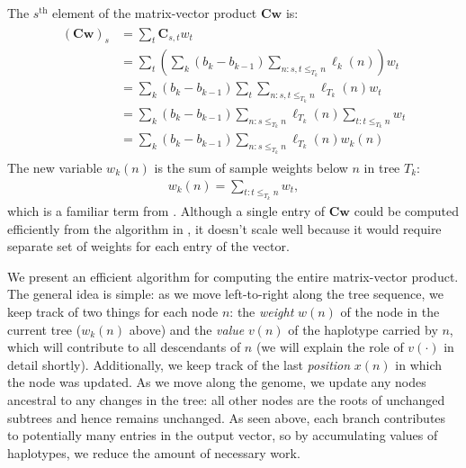 The $s^{\text{th}}$ element of the matrix-vector product $\mathbf{C}\mathbf{w}$ is:
\begin{align} \label{eq:similar_ralph2020}
    \begin{aligned}
        (\mathbf{C}\mathbf{w})_s &=
        \sum_t \mathbf{C}_{s,t} w_t \\
        &=
        \sum_t
        \left(
            \sum_k (b_k - b_{k-1}) \sum_{n: s,t \le_{T_k} n} \ell_k(n)
        \right) {w}_t \\
        &=
        \sum_k (b_k - b_{k-1})
        \sum_t
        \sum_{n: s,t \le_{T_k} n} \ell_{T_k}(n) {w}_t \\
        &=
        \sum_k (b_k - b_{k-1})
        \sum_{n: s\le_{T_k} n} \ell_{T_k}(n)
        \sum_{t:t \le_{T_k} n} {w}_t \\
        &=
        \sum_k (b_k - b_{k-1})
        \sum_{n: s\le_{T_k} n} \ell_{T_k}(n) w_k(n)
    \end{aligned}
\end{align}
The new variable $w_k(n)$ is the sum of sample weights below $n$ in tree $T_k$:
\begin{align}
    w_k(n) = \sum_{t:t \le_{T_k} n} {w}_t ,
\end{align}
which is a familiar term from \citet{ralph2020efficiently}.
Although a single entry of $\mathbf{C}\mathbf{w}$ could be computed efficiently
from the algorithm in \citet{ralph2020efficiently},
it doesn't scale well because it would require separate set of weights for each entry of the vector.

We present an efficient algorithm for computing the entire matrix-vector product.
The general idea is simple: as we move left-to-right along the tree sequence,
we keep track of two things for each node $n$:
the \textit{weight} $w(n)$ of the node in the current tree ($w_k(n)$ above) and
the \textit{value} $v(n)$ of the haplotype carried by $n$,
which will contribute to all descendants of $n$ (we will explain the role of $v(\cdot)$ in detail shortly).
Additionally, we keep track of the last \textit{position} $x(n)$ in which the node was updated.
As we move along the genome, we update any nodes ancestral to any changes in the tree:
all other nodes are the roots of unchanged subtrees and hence remains unchanged.
As seen above, each branch contributes to potentially many entries in the output vector,
so by accumulating values of haplotypes, we reduce the amount of necessary work.

